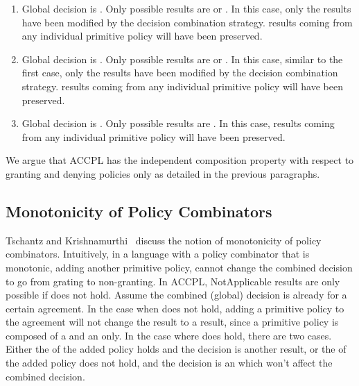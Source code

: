 \begin{enumerate}
  \item Global decision is . Only possible results are  or . In this case, only the  results have been modified by the decision combination strategy.  results coming from any individual primitive policy will have been preserved.
  \item Global decision is . Only possible results are  or . In this case, similar to the first case, only the  results have been modified by the decision combination strategy.  results coming from any individual primitive policy will have been preserved.
   \item Global decision is . Only possible results are .  In this case, results coming from any individual primitive policy will have been preserved.
\end{enumerate}

We argue that \ac{ACCPL} has the independent composition property with respect to granting and denying policies only as detailed in the previous paragraphs. 

\subsection{Monotonicity of Policy Combinators}

Tschantz and Krishnamurthi~\cite{Tschantz} discuss the notion of monotonicity of policy combinators. Intuitively, in a language with a policy combinator that is monotonic, adding another primitive policy, cannot change the combined decision to go from grating to non-granting. In \ac{ACCPL}, NotApplicable results are only possible if  does not hold. Assume the combined (global) decision is already  for a certain agreement. In the case when  does not hold, adding a primitive policy to the agreement will not change the  result to a  result, since a primitive policy is composed of a  and an  only. In the case where  does hold, there are two cases. Either the  of the added policy holds and the decision is another  result, or the  of the added policy does not hold, and the decision is an  which won't affect the combined decision.





